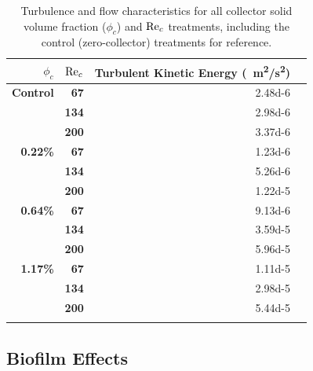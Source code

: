 \documentclass[geosciences,article,submit,moreauthors,pdftex]{Definitions/mdpi}
\begin{document}
\begin{table}[H]
\caption{Turbulence and flow characteristics for all collector solid volume fraction ($\phi_c$) and $\mathrm{Re}_c$ treatments, including the control (zero-collector) treatments for reference.}
\centering
\begin{tabular}{>{\bfseries}r>{\bfseries}rrr}
\toprule
\textbf{$\phi_c$}&\textbf{$\mathrm{Re}_c$}&\textbf{Turbulent Kinetic Energy (\SI{}{\metre^2/\second^2})}\\
\midrule
Control &   67  & \num{2.48d-6}\\
        &   134 & \num{2.98d-6}\\
        &   200 & \num{3.37d-6}\\
\midrule
0.22\% &   67  & \num{1.23d-6}\\
        &   134 & \num{5.26d-6}\\
        &   200 & \num{1.22d-5}\\
\midrule
0.64\% &   67  & \num{9.13d-6}\\
        &   134 & \num{3.59d-5}\\
        &   200 & \num{5.96d-5}\\
\midrule
1.17\%  &   67  & \num{1.11d-5}\\
        &   134 & \num{2.98d-5}\\
        &   200 & \num{5.44d-5}\\
\bottomrule
\label{tbl:turbulence}
\end{tabular}
\end{table}

\subsection{Biofilm Effects}
\end{document}
